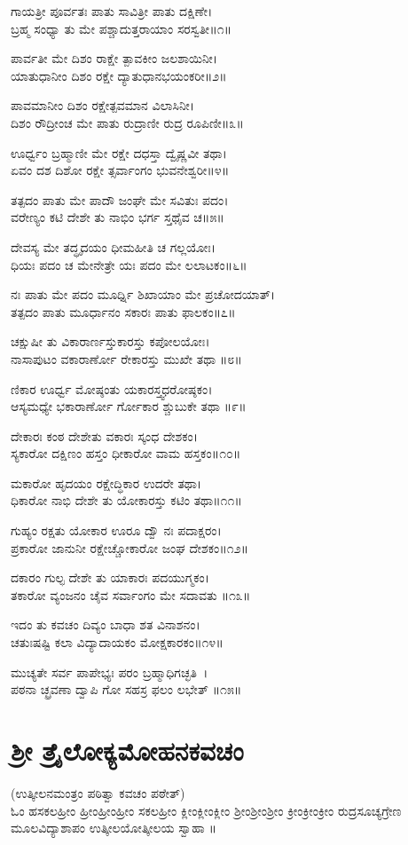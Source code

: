 ಗಾಯತ್ರೀ ಪೂರ್ವತಃ ಪಾತು ಸಾವಿತ್ರೀ ಪಾತು ದಕ್ಷಿಣೇ।\\
ಬ್ರಹ್ಮ ಸಂಧ್ಯಾ ತು ಮೇ ಪಶ್ಚಾದುತ್ತರಾಯಾಂ ಸರಸ್ವತೀ॥೧॥

ಪಾರ್ವತೀ ಮೇ ದಿಶಂ ರಾಕ್ಷೇ ತ್ಪಾವಕೀಂ ಜಲಶಾಯಿನೀ।\\
ಯಾತುಧಾನೀಂ ದಿಶಂ ರಕ್ಷೇ ದ್ಯಾತುಧಾನಭಯಂಕರೀ॥೨॥

ಪಾವಮಾನೀಂ ದಿಶಂ ರಕ್ಷೇತ್ಪವಮಾನ ವಿಲಾಸಿನೀ।\\
ದಿಶಂ ರೌದ್ರೀಂಚ ಮೇ ಪಾತು ರುದ್ರಾಣೀ ರುದ್ರ ರೂಪಿಣೀ॥೩॥

ಊರ್ಧ್ವಂ ಬ್ರಹ್ಮಾಣೀ ಮೇ ರಕ್ಷೇ ದಧಸ್ತಾ ದ್ವೈಷ್ಣವೀ ತಥಾ।\\
ಏವಂ ದಶ ದಿಶೋ ರಕ್ಷೇ ತ್ಸರ್ವಾಂಗಂ ಭುವನೇಶ್ವರೀ॥೪॥

ತತ್ಪದಂ ಪಾತು ಮೇ ಪಾದೌ ಜಂಘೇ ಮೇ ಸವಿತುಃ ಪದಂ।\\
ವರೇಣ್ಯಂ ಕಟಿ ದೇಶೇ ತು ನಾಭಿಂ ಭರ್ಗ ಸ್ತಥೈವ ಚ॥೫॥

ದೇವಸ್ಯ ಮೇ ತದ್ಧೃದಯಂ ಧೀಮಹೀತಿ ಚ ಗಲ್ಲಯೋಃ।\\
ಧಿಯಃ ಪದಂ ಚ ಮೇನೇತ್ರೇ ಯಃ ಪದಂ ಮೇ ಲಲಾಟಕಂ॥೬॥

ನಃ ಪಾತು ಮೇ ಪದಂ ಮೂರ್ಧ್ನಿ ಶಿಖಾಯಾಂ ಮೇ ಪ್ರಚೋದಯಾತ್।\\
ತತ್ಪದಂ ಪಾತು ಮೂರ್ಧಾನಂ ಸಕಾರಃ ಪಾತು ಫಾಲಕಂ॥೭॥

ಚಕ್ಷುಷೀ ತು ವಿಕಾರಾರ್ಣಸ್ತುಕಾರಸ್ತು ಕಪೋಲಯೋಃ।\\
ನಾಸಾಪುಟಂ ವಕಾರಾರ್ಣೋ ರೇಕಾರಸ್ತು ಮುಖೇ ತಥಾ ॥೮॥

ಣಿಕಾರ ಊರ್ಧ್ವ ಮೋಷ್ಠಂತು ಯಕಾರಸ್ತ್ವಧರೋಷ್ಠಕಂ।\\
ಆಸ್ಯಮಧ್ಯೇ ಭಕಾರಾರ್ಣೋ ರ್ಗೋಕಾರ ಶ್ಚುಬುಕೇ ತಥಾ ॥೯॥

ದೇಕಾರಃ ಕಂಠ ದೇಶೇತು ವಕಾರಃ ಸ್ಕಂಧ ದೇಶಕಂ।\\
ಸ್ಯಕಾರೋ ದಕ್ಷಿಣಂ ಹಸ್ತಂ ಧೀಕಾರೋ ವಾಮ ಹಸ್ತಕಂ॥೧೦॥

ಮಕಾರೋ ಹೃದಯಂ ರಕ್ಷೇದ್ಧಿಕಾರ ಉದರೇ ತಥಾ।\\
ಧಿಕಾರೋ ನಾಭಿ ದೇಶೇ ತು ಯೋಕಾರಸ್ತು ಕಟಿಂ ತಥಾ॥೧೧॥

ಗುಹ್ಯಂ ರಕ್ಷತು ಯೋಕಾರ ಊರೂ ದ್ವೌ ನಃ ಪದಾಕ್ಷರಂ।\\
ಪ್ರಕಾರೋ ಜಾನುನೀ ರಕ್ಷೇಚ್ಚೋಕಾರೋ ಜಂಘ ದೇಶಕಂ॥೧೨॥

ದಕಾರಂ ಗುಲ್ಫ ದೇಶೇ ತು ಯಾಕಾರಃ ಪದಯುಗ್ಮಕಂ।\\
ತಕಾರೋ ವ್ಯಂಜನಂ ಚೈವ ಸರ್ವಾಂಗಂ ಮೇ ಸದಾವತು ॥೧೩॥

ಇದಂ ತು ಕವಚಂ ದಿವ್ಯಂ ಬಾಧಾ ಶತ ವಿನಾಶನಂ।\\
ಚತುಃಷಷ್ಟಿ ಕಲಾ ವಿದ್ಯಾದಾಯಕಂ ಮೋಕ್ಷಕಾರಕಂ॥೧೪॥

ಮುಚ್ಯತೇ ಸರ್ವ ಪಾಪೇಭ್ಯಃ ಪರಂ ಬ್ರಹ್ಮಾಧಿಗಚ್ಛತಿ~।\\
ಪಠನಾ ಚ್ಛ್ರವಣಾ ದ್ವಾಪಿ ಗೋ ಸಹಸ್ರ ಫಲಂ ಲಭೇತ್ ॥೧೫॥

\section{ಶ್ರೀ ತ್ರೈಲೋಕ್ಯಮೋಹನಕವಚಂ }
(ಉತ್ಕೀಲನಮಂತ್ರಂ ಪಠಿತ್ವಾ ಕವಚಂ ಪಠೇತ್)\\
ಓಂ ಹಸಕಲಹ್ರೀಂ ಹ್ರೀಂಹ್ರೀಂಹ್ರೀಂ ಸಕಲಹ್ರೀಂ ಕ್ಲೀಂಕ್ಲೀಂಕ್ಲೀಂ  ಶ್ರೀಂಶ್ರೀಂಶ್ರೀಂ ಕ್ರೀಂಕ್ರೀಂಕ್ರೀಂ ರುದ್ರಸೂಚ್ಯಗ್ರೇಣ ಮೂಲವಿದ್ಯಾಶಾಪಂ ಉತ್ಕೀಲಯೋತ್ಕೀಲಯ ಸ್ವಾಹಾ ॥

